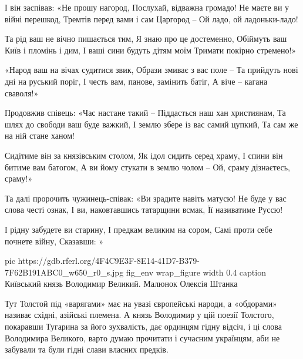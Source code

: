 \begin{multicols}{2}
        \obeycr
І він заспівав: «Не прошу нагород,
Послухай, відважна громадо!
Не маєте ви у війні перешкод,
Тремтів перед вами і сам Царгород –
Ой ладо, ой ладоньки-ладо!

Та рід ваш не вічно пишається тим,
Я знаю про це достеменно,
Обіймуть ваш Київ і пломінь і дим,
І ваші сини будуть дітям моїм
Тримати покірно стремено!»

«Народ ваш на вічах судитися звик,
Образи змиває з вас поле –
Та прийдуть нові дні на руський поріг,
І честь вам, панове, замінить батіг,
А віче – кагана сваволя!»

Продовжив співець: «Час настане такий –
Піддасться наш хан християнам,
Та шлях до свободи ваш буде важкий,
І землю збере із вас самий цупкий,
Та сам же на ній стане ханом!

Сидітиме він за князівським столом,
Як ідол сидить серед храму,
І спини він битиме вам батогом,
А ви йому стукати в землю чолом –
Ой, сраму дізнаєтесь, сраму!»

Та далі пророчить чужинець-співак:
«Ви зрадите навіть матусю!
Не буде у вас слова честі ознак,
І ви, наковтавшись татарщини всмак,
Її називатиме Руссю!

І рідну забудете ви старину,
І предкам великим на сором,
Самі проти себе почнете війну,
Сказавши: »
        \restorecr
\end{multicols}

\ifcmt
pic https://gdb.rferl.org/4F4C9E3F-8E14-41D7-B379-7F62B191ABC0_w650_r0_s.jpg
fig_env wrap_figure
width 0.4
caption Київський князь Володимир Великий. Малюнок Олексія Штанка 
\fi

Тут Толстой під «варягами» має на увазі європейські народи, а «обдорами»
називає східні, азійські племена. А князь Володимир у цій поезії Толстого,
покаравши Тугарина за його зухвалість, дає ординцям гідну відсіч, і ці слова
Володимира Великого, варто думаю прочитати і сучасним українцям, аби не
забували та були гідні слави власних предків.

